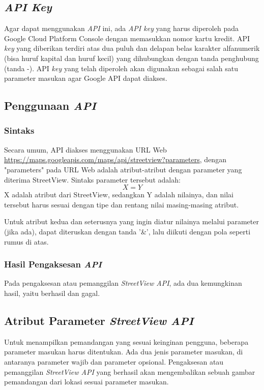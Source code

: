 \subsection{{\it API Key}}
\label{subs:api-key}
Agar dapat menggunakan {\it API} ini, ada {\it API key} yang harus diperoleh pada Google Cloud Platform Console dengan memasukkan nomor kartu kredit. API {\it key} yang diberikan terdiri atas dua puluh dan delapan belas karakter alfanumerik (bisa huruf kapital dan huruf kecil) yang dihubungkan dengan tanda penghubung (tanda -). API {\it key} yang telah diperoleh akan digunakan sebagai salah satu parameter masukan agar Google API dapat diakses. 

\subsection{Penggunaan {\it API}}
\label{subs:usage}

\subsubsection{Sintaks}
Secara umum, API diakses menggunakan URL Web \underline{https://maps.googleapis.com/maps/api/streetview?parameters}, dengan "parameters" pada URL Web adalah atribut-atribut dengan parameter yang diterima StreetView. Sintaks parameter tersebut adalah:
\begin{equation}
X = Y
\end{equation}
X adalah atribut dari StreetView, sedangkan Y adalah nilainya, dan nilai tersebut harus sesuai dengan tipe dan rentang nilai masing-masing atribut. 

Untuk atribut kedua dan seterusnya yang ingin diatur nilainya melalui parameter (jika ada), dapat diteruskan dengan tanda '\&', lalu diikuti dengan pola seperti rumus di atas. 

\subsubsection{Hasil Pengaksesan \textit{API}}
Pada pengaksesan atau pemanggilan {\it StreetView API}, ada dua kemungkinan hasil, yaitu berhasil dan gagal. 

\subsection{Atribut Parameter {\it StreetView API}}
\label{subs:parameter}
Untuk menampilkan pemandangan yang sesuai keinginan pengguna, beberapa parameter masukan harus ditentukan. Ada dua jenis parameter masukan, di antaranya parameter wajib dan parameter opsional. Pengaksesan atau pemanggilan {\it StreetView API} yang berhasil akan mengembalikan sebuah gambar pemandangan dari lokasi sesuai parameter masukan.


